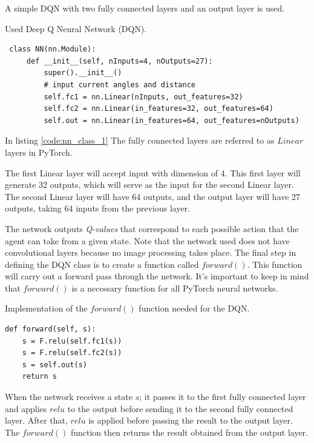 \documentclass[12pt,oneside]{article}
\begin{document}
A simple DQN with two fully connected layers and an output layer is used.
\begin{listing}[htbp]
\caption{Used Deep Q Neural Network (DQN).}
\label{code:nn_class_1}
\begin{tcolorbox}[]
\begin{verbatim}
 class NN(nn.Module):
     def __init__(self, nInputs=4, nOutputs=27):
         super().__init__()
         # input current angles and distance
         self.fc1 = nn.Linear(nInputs, out_features=32)
         self.fc2 = nn.Linear(in_features=32, out_features=64)
         self.out = nn.Linear(in_features=64, out_features=nOutputs)
\end{verbatim}
\end{tcolorbox}
\end{listing} 

In listing \ref{code:nn_class_1} The fully connected layers are referred to as $Linear$ layers in PyTorch.

The first Linear layer will accept input with dimension of 4. This first layer will generate 32 outputs, which will serve as the input for the second Linear layer. The second Linear layer will have 64 outputs, and the output layer will have 27 outputs, taking 64 inputs from the previous layer.

The network outputs \textit{Q-values} that correspond to each possible action that the agent can take from a given state. Note that the network used does not have convolutional layers because no image processing takes place.
The final step in defining the DQN class is to create a function called $forward()$. This function will carry out a forward pass through the network. It's important to keep in mind that $forward()$ is a necessary function for all PyTorch neural networks.

\begin{listing}[htbp]
\caption{Implementation of the $forward()$ function needed for the DQN.}
\label{code:nn_class_2}
\begin{tcolorbox}[]
\begin{verbatim}
def forward(self, s):
    s = F.relu(self.fc1(s))
    s = F.relu(self.fc2(s))
    s = self.out(s)
    return s
\end{verbatim}
\end{tcolorbox}
\end{listing} 
When the network receives a state $s$; it passes it to the first fully connected layer and applies $relu$ to the output before sending it to the second fully connected layer. After that, $relu$ is applied before passing the result to the output layer. The $forward()$ function then returns the result obtained from the output layer.
\end{document}
